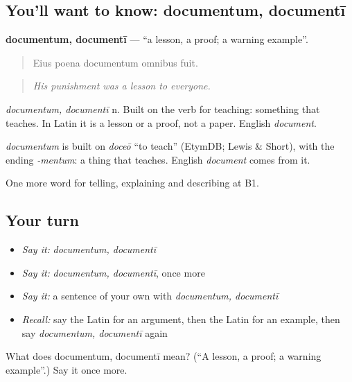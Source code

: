 \subsection*{You'll want to know: documentum, documentī}
\textbf{documentum, documentī} — \textquotedblleft{}a lesson, a proof; a warning example\textquotedblright{}.

\begin{quote}
Eius poena documentum omnibus fuit.
\end{quote}

\begin{quote}
\emph{His punishment was a lesson to everyone.}
\end{quote}

\emph{documentum, documentī} n. Built on the verb for teaching: something that teaches. In Latin it is a lesson or a proof, not a paper. English \emph{document}.

\begin{cousinweb}
\emph{documentum} is built on \emph{doceō} \textquotedblleft{}to teach\textquotedblright{} (EtymDB; Lewis \& Short), with the ending \emph{-mentum}: a thing that teaches. English \emph{document} comes from it.
\end{cousinweb}

\begin{grammarlens}[title={What you've built}]
One more word for telling, explaining and describing at B1.
\end{grammarlens}

\subsection*{Your turn}
\begin{itemize}
\raggedright
  \item \emph{Say it:} \emph{documentum, documentī}
  \item \emph{Say it:} \emph{documentum, documentī}, once more
  \item \emph{Say it:} a sentence of your own with \emph{documentum, documentī}
  \item \emph{Recall:} say the Latin for an argument, then the Latin for an example, then say \emph{documentum, documentī} again
\end{itemize}

\begin{tcolorbox}[breakable,colback=teal!4,colframe=teal!35!black,title={Before you move on}]
What does documentum, documentī mean? (\textquotedblleft{}A lesson, a proof; a warning example\textquotedblright{}.) Say it once more.
\end{tcolorbox}
